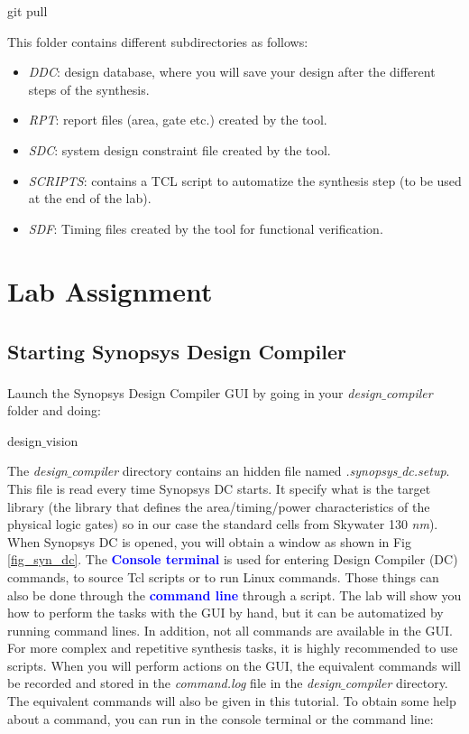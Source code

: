 \begin{codeline}
	git pull
\end{codeline}

This folder contains different subdirectories as follows:
 \begin{itemize}
\item \textit{DDC}: design database, where you will save your design after the different steps of the synthesis.
\item \textit{RPT}: report files (area, gate etc.) created by the tool.
\item \textit{SDC}: system design constraint file created by the tool.
\item \textit{SCRIPTS}: contains a TCL script to automatize the synthesis step (to be used at the end of the lab).
\item \textit{SDF}: Timing files created by the tool for functional verification.
\end{itemize}





\section{Lab Assignment}


\subsection{Starting Synopsys Design Compiler\textsuperscript{\tiny\textregistered}}
Launch the Synopsys Design Compiler\textsuperscript{\tiny\textregistered} GUI by going in your \textit{design$\_$compiler} folder and doing:
	\begin{codeline}
	design$\_$vision
\end{codeline}

The \textit{design$\_$compiler} directory contains an hidden file named \textit{.synopsys$\_$dc.setup}. This file is read every time Synopsys DC starts.
It specify what is the target library (the library that defines the area/timing/power characteristics of the physical logic gates) so in our case the standard cells from Skywater 130 \emph{nm}).\\


When Synopsys DC is opened, you will obtain a window as shown in Fig \ref{fig_syn_dc}. The \textbf{\textcolor{blue}{Console terminal}} is used for entering Design Compiler (DC) commands, to source Tcl scripts or to run Linux commands. Those things can also be done through the \textbf{\textcolor{blue}{command line}} through a script. The lab will show you how to perform the tasks with the GUI by hand, but it can be automatized by running command lines. In addition, not all commands are available in the GUI. For more complex and repetitive synthesis tasks, it is highly recommended to use scripts. When you will perform actions on the GUI, the equivalent commands will be recorded and stored in the \textit{command.log} file in the \textit{design$\_$compiler} directory. The equivalent commands will also be given in this tutorial. To obtain some help about a command, you can run in the console terminal or the command line: 	

